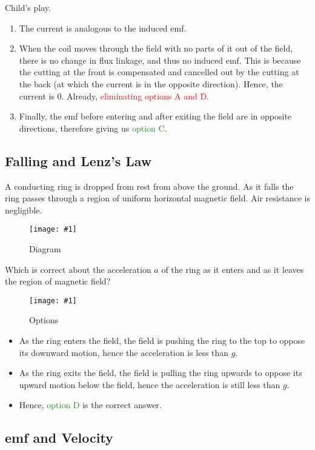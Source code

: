 \documentclass[a4paper,12pt]{article}
\newcommand{\img}[4]{\begin{center}
  \begin{figure}[H]
    \centering
    \texttt{[image: \#1]}
    \caption{#3}
    \label{fig:#4}
  \end{figure}
\end{center}}
\begin{document}
Child's play.
\begin{enumerate}
  \item The current is analogous to the induced emf.
  \item When the coil moves through the field with no parts of it out of the field, there is no change in flux linkage, and thus no induced emf. This is because the cutting at the front is compensated and cancelled out by the cutting at the back (at which the current is in the opposite direction). Hence, the current is 0. Already, \textcolor{red}{eliminating options A and D}.
  \item Finally, the emf before entering and after exiting the field are in opposite directions, therefore giving us \textcolor{ForestGreen}{option C}.
\end{enumerate}

\pagebreak

\subsection{Falling and Lenz's Law}

A conducting ring is dropped from rest from above the ground. As it falls the ring passes through a region of uniform horizontal magnetic field. Air resistance is negligible.

\img{ex/6.png}{0.25}{Diagram}{ring}

Which is correct about the acceleration $a$ of the ring as it enters and as it leaves the region of magnetic field?

\img{ex/7.png}{0.5}{Options}{Options}

\begin{itemize}
  \item As the ring enters the field, the field is pushing the ring to the top to oppose its downward motion, hence the acceleration is less than $g$.
  \item As the ring exits the field, the field is pulling the ring upwards to oppose its upward motion below the field, hence the acceleration is still less than $g$.
  \item Hence, \textcolor{ForestGreen}{option D} is the correct answer.
\end{itemize}

\pagebreak

\subsection{emf and Velocity}
\end{document}
